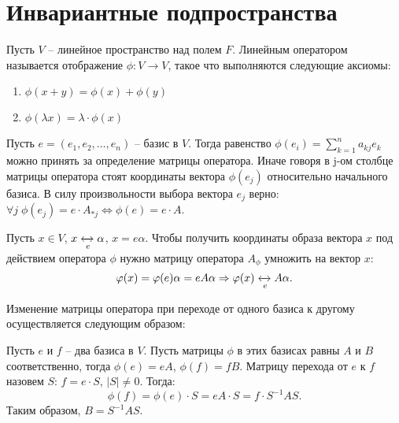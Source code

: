 \section{Инвариантные подпространства}

\begin{reminder}
    Пусть $V$ -- линейное пространство над полем $F$. Линейным оператором называется отображение 
    $\phi: V \to V$, такое что выполняются следующие аксиомы:
    \begin{enumerate}
        \item $\phi (x+y) = \phi(x) + \phi (y)$
        \item $\phi(\lambda x) = \lambda \cdot \phi(x)$
    \end{enumerate}

\end{reminder}

\begin{reminder}
    Пусть $e = (e_1, e_2, \dots, e_n)$ -- базис в $V$. Тогда равенство 
    $\phi(e_i) = \displaystyle\sum_{k = 1}^{n} a_{kj} e_k$ можно принять за определение матрицы 
    оператора. Иначе говоря в j-ом столбце матрицы оператора стоят координаты вектора $\phi(e_{j})$ 
    относительно начального базиса. В силу произвольности выбора вектора $e_j$ верно: 
    $\forall j \; \phi(e_j) = e \cdot A_{*j} \Leftrightarrow \phi(e) = e \cdot A$.
\end{reminder}

\begin{example}
    Пусть $x \in V$, $x \xleftrightarrow[e]{} \alpha$, $x = e \alpha$.
    Чтобы получить координаты образа вектора $x$ под действием оператора $\phi$ нужно матрицу 
    оператора $A_{\phi}$ умножить на вектор $x$:
    $$\phi(x) = \phi(e) \alpha = e A \alpha \Rightarrow \phi(x) \xleftrightarrow[e]{} A \alpha.$$
\end{example}

\begin{reminder}
    Изменение матрицы оператора при переходе от одного базиса к другому осуществляется следующим образом:

    Пусть $e$ и $f$ -- два базиса в $V$. Пусть матрицы $\phi$ в этих базисах равны $A$ и $B$ 
    соответственно, тогда $\phi(e) = eA$, $\phi(f) = fB$.
    Матрицу перехода от $e$ к $f$ назовем $S$: $f = e \cdot S$, $|S| \neq 0$.
    Тогда: 
    $$\phi(f) = \phi(e) \cdot S = e A \cdot S = f \cdot S^{-1} A S.$$ 
    Таким образом, $B = S^{-1} A S$.
\end{reminder}

